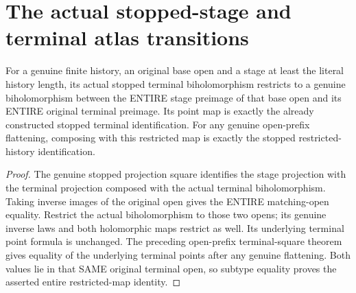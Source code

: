 \section{The actual stopped-stage and terminal atlas transitions}

\begin{lemma}
\label{hir:sharp-actual-curve-stopped-terminal-open-biholomorphism}
\leanok
For a genuine finite history, an original base open and a stage at least
the literal history length, its actual stopped terminal biholomorphism
restricts to a genuine biholomorphism between the ENTIRE stage preimage
of that base open and its ENTIRE original terminal preimage. Its point
map is exactly the already constructed stopped terminal identification.
For any genuine open-prefix flattening, composing with this restricted
map is exactly the stopped restricted-history identification.
\end{lemma}
\begin{proof}
The genuine stopped projection square identifies the stage projection
with the terminal projection composed with the actual terminal
biholomorphism. Taking inverse images of the original open gives the
ENTIRE matching-open equality. Restrict the actual biholomorphism to
those two opens; its genuine inverse laws and both holomorphic maps
restrict as well. Its underlying terminal point formula is unchanged.
The preceding open-prefix terminal-square theorem gives equality of
the underlying terminal points after any genuine flattening. Both
values lie in that SAME original terminal open, so subtype equality
proves the asserted entire restricted-map identity.
\end{proof}

